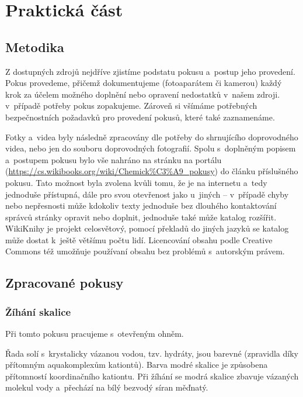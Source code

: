 \chapter{Praktická část}

\section{Metodika}
Z dostupných zdrojů nejdříve zjistíme podstatu pokusu a~postup jeho provedení. Pokus provedeme, přičemž dokumentujeme (fotoaparátem či kamerou) každý krok za účelem možného doplnění nebo opravení nedostatků v~našem zdroji. v~případě potřeby pokus zopakujeme. Zároveň si všímáme potřebných bezpečnostních požadavků pro provedení pokusů, které také zaznamenáme.

Fotky a~videa byly následně zpracovány dle potřeby do shrnujícího doprovodného videa, nebo jen do souboru doprovodných fotografií. Spolu s~doplněným popisem a~postupem pokusu bylo vše nahráno na stránku  na portálu  (\url{https://cs.wikibooks.org/wiki/Chemick%C3%A9_pokusy}) do článku příslušného pokusu. Tato možnost byla zvolena kvůli tomu, že je na internetu a~tedy jednoduše přístupná, dále pro svou otevřenost jako u~jiných \uv{wiki projektů} -- v~případě chyby nebo nepřesnosti může kdokoliv texty jednoduše bez dlouhého kontaktování správců stránky opravit nebo doplnit, jednoduše také může katalog rozšířit. WikiKnihy je projekt celosvětový, pomocí překladů do jiných jazyků se katalog může dostat k~ještě většímu počtu lidí. Licencování obsahu podle Creative Commons též umožňuje používaní obsahu bez problémů s~autorským právem.


\section{Zpracované pokusy}
\subsection{Žíhání skalice}


Při tomto pokusu pracujeme s~otevřeným ohněm.

\hspace{-21px} 

Řada solí s~krystalicky vázanou vodou, tzv. hydráty, jsou barevné (zpravidla díky přítomným aquakomplexům kationtů). Barva modré skalice je způsobena přítomností koordinačního kationtu. Při žíhání se modrá skalice zbavuje vázaných molekul vody a~přechází na bílý bezvodý síran měďnatý.

